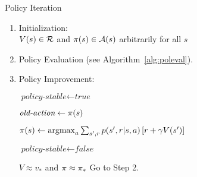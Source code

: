 
\begin{algorithm}
\caption{Policy Iteration}
\label{alg:politer}

\begin{enumerate}[topsep=0pt]

	\item Initialization: \\
		$V(s) \in \mathcal{R}$
		and
		$\pi(s) \in \mathcal{A}(s)$ arbitrarily for all $s$

	\item Policy Evaluation (see Algorithm~\ref{alg:poleval}).


	\item Policy Improvement:
		\begin{algorithmic}[0]
			\State $\textit{policy-stable} \gets \textit{true}$


				\State $\textit{old-action} \gets \pi(s)$

				\State $\pi(s) \gets
					\operatorname*{argmax}_{a} \sum_{s',r} {
						p(s',r|s,a)\left[r+\gamma V(s')\right]
						}$

					\State $\textit{policy-stable} \gets \textit{false}$
				\EndIf

			\EndFor

				\State \Return $V \approx v_*$
					and $\pi \approx \pi_*$
			\Else
				\State Go to Step 2.
			\EndIf
		\end{algorithmic}

\end{enumerate}

\end{algorithm}
